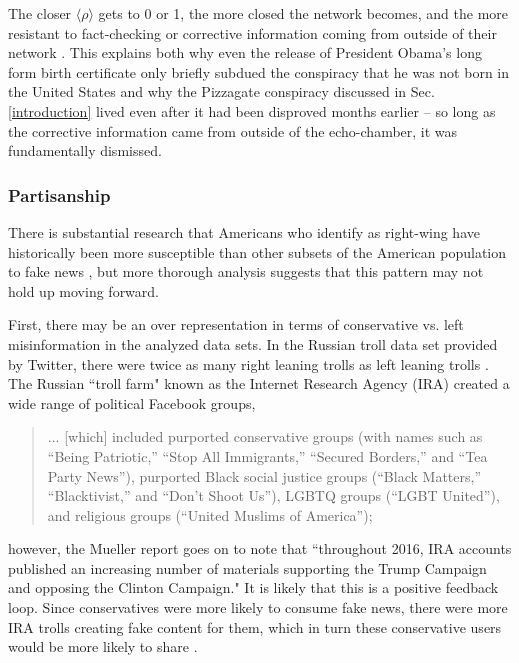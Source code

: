 \documentclass[preprint,review,12pt]{elsarticle}
\begin{document}
The closer $\langle \rho \rangle$ gets to 0 or 1, the more closed the network becomes, and the more resistant to fact-checking or corrective information coming from outside of their network \cite{garrett2013undermining,lord1979biased,edwards1996disconfirmation,redlawsk2002hot, taber2006motivated}. This explains both why even the release of President Obama's long form birth certificate only briefly subdued the conspiracy that he was not born in the United States \cite{nyhan2012new} and why the Pizzagate conspiracy discussed in Sec. \ref{introduction} lived even after it had been disproved months earlier -- so long as the corrective information came from outside of the echo-chamber, it was fundamentally dismissed.


\subsubsection{Partisanship} 
\label{Partisanship Section}
There is substantial research that Americans who identify as right-wing have historically been more susceptible than other subsets of the American population to fake news \cite{guess2019less,benkler2018network,grinberg2019fake,allcott2017social,badawy2018analyzing}, but more thorough analysis suggests that this pattern may not hold up moving forward.

First, there may be an over representation in terms of conservative vs. left misinformation in the analyzed data sets. In the Russian troll data set provided by Twitter, there were twice as many right leaning trolls as left leaning trolls \cite{freelon2020black,badawy2018analyzing,benkler2018network}. The Russian ``troll farm" known as the Internet Research Agency (IRA) created a wide range of political Facebook groups,\begin{quote}
    ... [which] included purported conservative groups (with names such as “Being Patriotic,” “Stop All Immigrants,” “Secured Borders,” and “Tea Party News”), purported Black social justice groups (“Black Matters,” “Blacktivist,” and “Don’t Shoot Us”), LGBTQ groups (“LGBT United”), and religious groups (“United Muslims of America”)\cite{mueller2019mueller};
\end{quote} however, the Mueller report goes on to note that ``throughout 2016, IRA accounts published an increasing number of materials supporting the Trump Campaign and opposing the Clinton Campaign." It is likely that this is a positive feedback loop. Since conservatives were more likely to consume fake news, there were more IRA trolls creating fake content for them, which  in turn these conservative users would be more likely to share \cite{bakir2018fake,bodo2019interested,silverman2016analysis,pariser2011filter}. 
\end{document}
